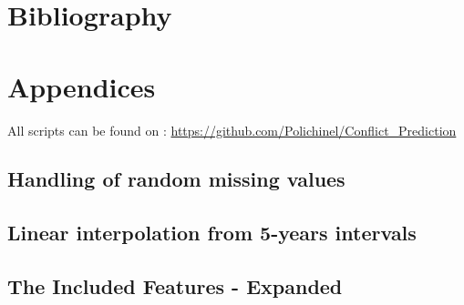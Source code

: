 \documentclass[a4paper]{article}
\begin{document}







\pagebreak

\section{Bibliography}
 


\pagebreak
\section{Appendices}

All scripts can be found on : \hyperlink{https://github.com/Polichinel/Conflict_Prediction}{https://github.com/Polichinel/Conflict\_Prediction}

\subsection{Handling of random missing values}\label{missing}

\subsection{Linear interpolation from 5-years intervals}\label{interpolation}

\subsection{The Included Features - Expanded}\label{feature_expanded}
\end{document}
